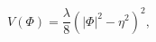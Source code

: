 \begin{equation}\label{eq:V}
V(\Phi)=\frac{\lambda}{8}\left(\vert\Phi\vert^2-\eta^2\right)^2,
\end{equation}

